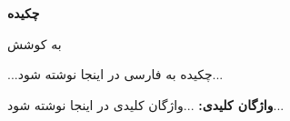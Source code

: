 {
    \centering
    \textbf{چکیده}

    \vspace{\baselineskip}
    \textbf{\PersianThesisTitle}

    \vspace{2\baselineskip}
    به کوشش \\
    \textbf{\PersianStudentName}
    \par
}

\vspace{2\baselineskip}
...چکیده به فارسی در اینجا نوشته شود...

\vspace{\baselineskip}
\textbf{واژگان کلیدی:}
...واژگان کلیدی در اینجا نوشته شود...
